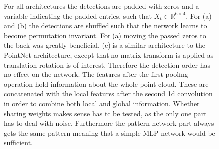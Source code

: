 \documentclass{article}
\begin{document}
\begin{figure}[!htbp]
	\begin{center}
	\end{center}
	\caption{For all architectures the detections are padded with zeros and a variable indicating the padded entries, such that $X_t \in \mathbb{R}^{6\times4}$. For (a) and (b) the detections are shuffled such that the network learns to become permutation invariant. For (a) moving the passed zeros to the back was greatly beneficial. (c) is a similar architecture to the PointNet \cite{PointNet} architecture, except that no matrix transform is applied as translation rotation is of interest. Therefore the detection order has no effect on the network. The features after the first pooling operation hold information about the whole point cloud. These are concatenated with the local features after the second 1d convolution in order to combine both local and global information. Whether sharing weights makes sense has to be tested, as the only one part has to deal with noise. Furthermore the pattern-network-part always gets the same pattern meaning that a simple MLP network would be sufficient.}
	\label{encoder_architecture}
\end{figure}
\end{document}
